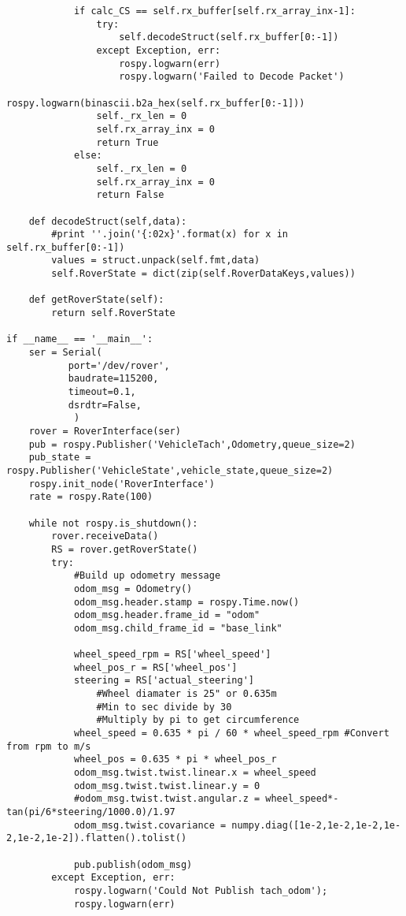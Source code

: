\begin{verbatim}
            if calc_CS == self.rx_buffer[self.rx_array_inx-1]:
                try:
                    self.decodeStruct(self.rx_buffer[0:-1])
                except Exception, err:
                    rospy.logwarn(err)
                    rospy.logwarn('Failed to Decode Packet')
                    rospy.logwarn(binascii.b2a_hex(self.rx_buffer[0:-1]))
                self._rx_len = 0
                self.rx_array_inx = 0
                return True
            else:
                self._rx_len = 0
                self.rx_array_inx = 0
                return False

    def decodeStruct(self,data):
        #print ''.join('{:02x}'.format(x) for x in self.rx_buffer[0:-1])
        values = struct.unpack(self.fmt,data)
        self.RoverState = dict(zip(self.RoverDataKeys,values))

    def getRoverState(self):
        return self.RoverState

if __name__ == '__main__':
    ser = Serial(
           port='/dev/rover',
           baudrate=115200,
           timeout=0.1,
           dsrdtr=False,
            )
    rover = RoverInterface(ser)
    pub = rospy.Publisher('VehicleTach',Odometry,queue_size=2)
    pub_state = rospy.Publisher('VehicleState',vehicle_state,queue_size=2)
    rospy.init_node('RoverInterface')
    rate = rospy.Rate(100)

    while not rospy.is_shutdown():
        rover.receiveData()
        RS = rover.getRoverState()
        try:
            #Build up odometry message
            odom_msg = Odometry()
            odom_msg.header.stamp = rospy.Time.now()
            odom_msg.header.frame_id = "odom"
            odom_msg.child_frame_id = "base_link"
            
            wheel_speed_rpm = RS['wheel_speed']
            wheel_pos_r = RS['wheel_pos']
            steering = RS['actual_steering']
                #Wheel diamater is 25" or 0.635m
                #Min to sec divide by 30
                #Multiply by pi to get circumference
            wheel_speed = 0.635 * pi / 60 * wheel_speed_rpm #Convert from rpm to m/s
            wheel_pos = 0.635 * pi * wheel_pos_r
            odom_msg.twist.twist.linear.x = wheel_speed
            odom_msg.twist.twist.linear.y = 0
            #odom_msg.twist.twist.angular.z = wheel_speed*-tan(pi/6*steering/1000.0)/1.97
            odom_msg.twist.covariance = numpy.diag([1e-2,1e-2,1e-2,1e-2,1e-2,1e-2]).flatten().tolist()

            pub.publish(odom_msg)
        except Exception, err:
            rospy.logwarn('Could Not Publish tach_odom');
            rospy.logwarn(err)


\end{verbatim}
